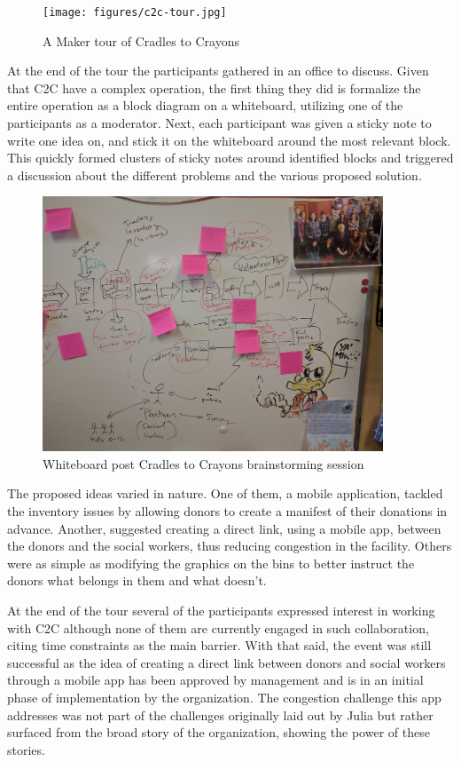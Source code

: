    \begin{figure}[thpb]
      \centering
      \texttt{[image: figures/c2c-tour.jpg]}
      \caption{A Maker tour of Cradles to Crayons}
      \label{fig_setc_class}
   \end{figure}

At the end of the tour the participants gathered in an office to discuss. Given that C2C have a complex operation, the first thing they did is formalize the entire operation as a block diagram on a whiteboard, utilizing one of the participants as a moderator. Next, each participant was given a sticky note to write one idea on, and stick it on the whiteboard around the most relevant block. This quickly formed clusters of sticky notes around identified blocks and triggered a discussion about the different problems and the various proposed solution. 

   \begin{figure}[thpb]
      \centering
      \includegraphics[width=4in]{figures/c2c-brainstorming.jpg}
      \caption{Whiteboard post Cradles to Crayons brainstorming session}
      \label{fig_setc_class}
   \end{figure}


The proposed ideas varied in nature. One of them, a mobile application, tackled the inventory issues by allowing donors to create a manifest of their donations in advance. Another, suggested creating a direct link, using a mobile app, between the donors and the social workers, thus reducing congestion in the facility. Others were as simple as modifying the graphics on the bins to better instruct the donors what belongs in them and what doesn't. 

At the end of the tour several of the participants expressed interest in working with C2C although none of them are currently engaged in such collaboration, citing time constraints as the main barrier. With that said, the event was still successful as the idea of creating a direct link between donors and social workers through a mobile app has been approved by management and is in an initial phase of implementation by the organization. The congestion challenge this app addresses was not part of the challenges originally laid out by Julia but rather surfaced from the broad story of the organization, showing the power of these stories.  

